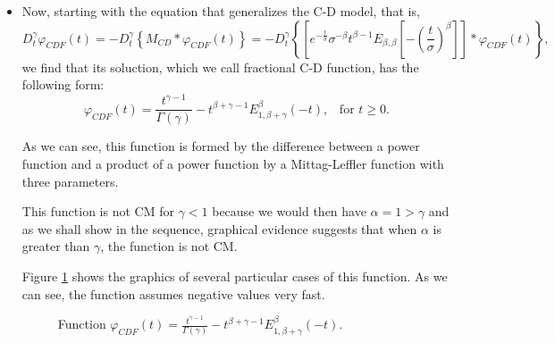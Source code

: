 \documentclass[12pt]{amsart}
\numberwithin{equation}{section}
\begin{document}
\begin{itemize}
\item Now, starting with the equation that generalizes the C-D model, that
	is, 
\begin{equation}
D^{\gamma}_{t}\varphi_{CDF}(t)=-
	D^{\gamma}_{t}\left\{M_{CD}\ast\varphi_{CDF}(t)\right\}=-
	D^{\gamma}_{t}\left\{\left[
	e^{-\frac{t}{\sigma}}\sigma^{-\beta}t^{\beta-1}E_{\beta,\beta}\left[-
	\left(\frac{t}{\sigma}\right)^{\beta}\right]
	\right]\ast\varphi_{CDF}(t)\right\},
\label{cdf1}
\end{equation}
we find that its soluction, which we call fractional C-D function, has the
following form: 
\begin{equation}
\varphi_{CDF}(t)=
	\frac{t^{\gamma-1}}{\Gamma(\gamma)}-t^{\beta+\gamma-1}
	E_{1,\beta+\gamma}^{\beta}(-t), \,\,\,\,\,\mbox{for}\,\,t\geq0.
\label{artigo28}
\end{equation}

As we can see, this function is formed by the difference between a power
function and a product of a power function by a Mittag-Leffler function
with three parameters. 

This function is not CM for $\gamma <1$ because we would then have $\alpha
= 1 > \gamma$ and as we shall show in the sequence, graphical evidence
suggests that when $\alpha$ is greater than $\gamma$, the function is not
CM. 


Figure \ref{figura9} shows the graphics of several particular cases of this
function. As we can see, the function assumes negative values very fast.

\begin{figure}[H]
\center
{}
\qquad
{}
\qquad
{}
\qquad
{}
\qquad
{}
\qquad
{}
\caption{Function $\varphi_{CDF}(t)=
	\frac{t^{\gamma-1}}{\Gamma(\gamma)}
	-t^{\beta+\gamma-1} E_{1,\beta+\gamma}^{\beta}(-t)$.}
\label{figura9}
\end{figure}


\end{itemize}
\end{document}
